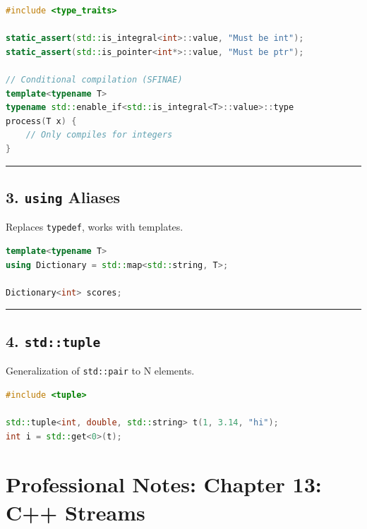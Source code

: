 \begin{lstlisting}[language={C++}]
#include <type_traits>

static_assert(std::is_integral<int>::value, "Must be int");
static_assert(std::is_pointer<int*>::value, "Must be ptr");

// Conditional compilation (SFINAE)
template<typename T>
typename std::enable_if<std::is_integral<T>::value>::type
process(T x) {
    // Only compiles for integers
}
\end{lstlisting}

\begin{center}\rule{0.5\linewidth}{0.5pt}\end{center}

\hypertarget{using-aliases}{%
\section{\texorpdfstring{3. \texttt{using}
Aliases}{3. using Aliases}}\label{using-aliases}}

Replaces \passthrough{\lstinline!typedef!}, works with templates.

\begin{lstlisting}[language={C++}]
template<typename T>
using Dictionary = std::map<std::string, T>;

Dictionary<int> scores;
\end{lstlisting}

\begin{center}\rule{0.5\linewidth}{0.5pt}\end{center}

\hypertarget{stdtuple}{%
\section{\texorpdfstring{4.
\texttt{std::tuple}}{4. std::tuple}}\label{stdtuple}}

Generalization of \passthrough{\lstinline!std::pair!} to N elements.

\begin{lstlisting}[language={C++}]
#include <tuple>

std::tuple<int, double, std::string> t(1, 3.14, "hi");
int i = std::get<0>(t);
\end{lstlisting}

\hypertarget{professional-notes-chapter-13-c-streams}{%
\chapter{Professional Notes: Chapter 13: C++
Streams}\label{professional-notes-chapter-13-c-streams}}

